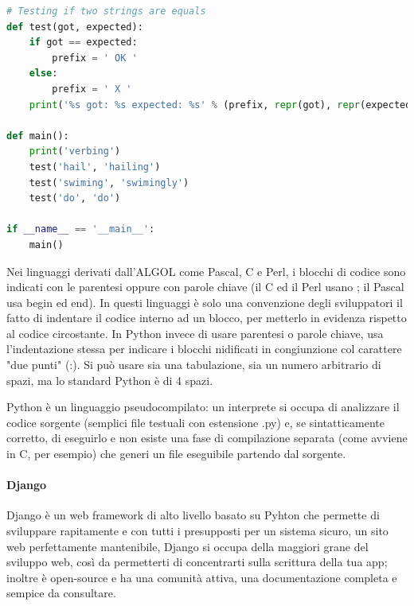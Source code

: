 \lstset{style=python_code_style}
\begin{lstlisting}[language=Python, caption={Esempio di programma in Python}]
# Testing if two strings are equals
def test(got, expected):
	if got == expected:
		prefix = ' OK '
	else:
		prefix = ' X '
	print('%s got: %s expected: %s' % (prefix, repr(got), repr(expected)))

def main():
	print('verbing')
	test('hail', 'hailing')
	test('swiming', 'swimingly')
	test('do', 'do')

if __name__ == '__main__':
	main()
\end{lstlisting}

Nei linguaggi derivati dall'ALGOL come Pascal, C e Perl, i blocchi di codice sono indicati con le parentesi oppure con parole chiave 
(il C ed il Perl usano { }; il Pascal usa begin ed end). In questi linguaggi è solo una convenzione degli sviluppatori il fatto di 
indentare il codice interno ad un blocco, per metterlo in evidenza rispetto al codice circostante. In Python invece di usare parentesi 
o parole chiave, usa l'indentazione stessa per indicare i blocchi nidificati in congiunzione col carattere "due punti" (:). Si può usare 
sia una tabulazione, sia un numero arbitrario di spazi, ma lo standard Python è di 4 spazi. 

Python è un linguaggio pseudocompilato: un interprete si occupa di analizzare il codice sorgente (semplici file testuali con 
estensione .py) e, se sintatticamente corretto, di eseguirlo e non esiste una fase di compilazione separata (come 
avviene in C, per esempio) che generi un file eseguibile partendo dal sorgente. \cite{python-documentation}

\paragraph{Django}
Django è un web framework di alto livello basato su Pyhton che permette di sviluppare rapitamente e con tutti i presupposti per un sistema sicuro, un sito web
perfettamente mantenibile, Django si occupa della maggiori grane del sviluppo web, così da permetterti di concentrarti sulla scrittura della tua app; inoltre 
è open-source e ha una comunità attiva, una documentazione completa e sempice da consultare.

